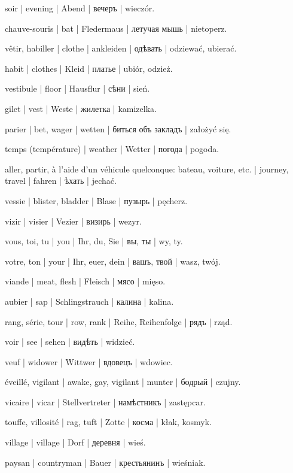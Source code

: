 \begin{outdent}{1em}
soir | evening | Abend | вечеръ | wieczór.

chauve-souris | bat | Fledermaus | летучая мышь | nietoperz.

vêtir, habiller | clothe | ankleiden | одѣвать | odziewać,
ubierać.

\uvsubentry{}
habit | clothes | Kleid | платье | ubiór, odzież.

vestibule | floor | Hausflur | сѣни | sień.

gilet | vest | Weste | жилетка | kamizelka.

parier | bet, wager | wetten | биться объ закладъ | założyć
się.

temps (température) | weather | Wetter | погода | pogoda.

aller, partir, à l’aide d’un véhicule quelconque: bateau,
voiture, etc. | journey, travel | fahren | ѣхать | jechać.

vessie | blister, bladder | Blase | пузырь | pęcherz.

vizir | visier | Vezier | визирь | wezyr.

vous, toi, tu | you | Ihr, du, Sie | вы, ты | wy, ty.

\uvsubentry{}
votre, ton | your | Ihr, euer, dein | вашъ, твой | wasz, twój.

viande | meat, flesh | Fleisch | мясо | mięso.

aubier | sap | Schlingstrauch | калина | kalina.

rang, série, tour | row, rank | Reihe, Reihenfolge | рядъ | rząd.

voir | see | sehen | видѣть | widzieć.

veuf | widower | Wittwer | вдовецъ | wdowiec.

éveillé, vigilant | awake, gay, vigilant | munter | бодрый | czujny.

vicaire | vicar | Stellvertreter | намѣстникъ | zastępcar.

touffe, villosité | rag, tuft | Zotte | косма | kłak, kosmyk.

village | village | Dorf | деревня | wieś.

\uvsubentry{}
paysan | countryman | Bauer | крестьянинъ | wieśniak.


\end{outdent}

